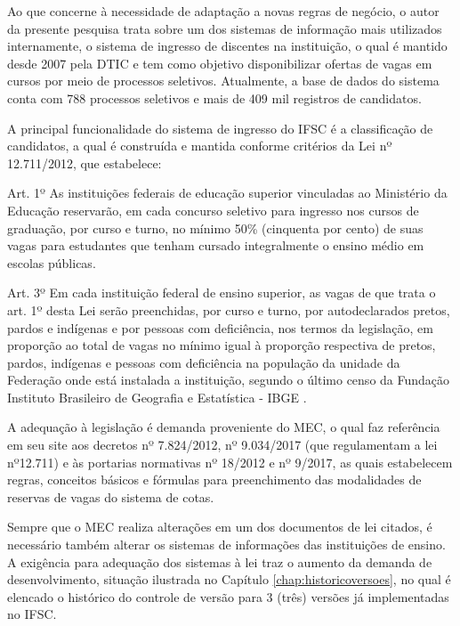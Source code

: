  Ao que concerne à necessidade de adaptação a novas regras de negócio, o autor da presente pesquisa trata sobre um dos sistemas de informação mais utilizados internamente, o sistema de ingresso de discentes na instituição, o qual é mantido desde 2007 pela \gls{DTIC} e tem como objetivo disponibilizar ofertas de vagas em cursos por meio de processos seletivos. Atualmente, a base de dados do sistema conta com 788 processos seletivos e mais de 409 mil registros de candidatos.
 
 A principal funcionalidade do sistema de ingresso do \gls{IFSC} é a classificação de candidatos, a qual é construída e mantida conforme critérios da Lei nº 12.711/2012, que estabelece:
 \begin{citacao}
 Art. 1º As instituições federais de educação superior vinculadas ao Ministério da Educação reservarão, em cada concurso seletivo para ingresso nos cursos de graduação, por curso e turno, no mínimo 50\% (cinquenta por cento) de suas vagas para estudantes que tenham cursado integralmente o ensino médio em escolas públicas.
 
 Art. 3º Em cada instituição federal de ensino superior, as vagas de que trata o art. 1º desta Lei serão preenchidas, por curso e turno, por autodeclarados pretos, pardos e indígenas e por pessoas com deficiência, nos termos da legislação, em proporção ao total de vagas no mínimo igual à proporção respectiva de pretos, pardos, indígenas e pessoas com deficiência na população da unidade da Federação onde está instalada a instituição, segundo o último censo da Fundação Instituto Brasileiro de Geografia e Estatística - IBGE \cite{leicotas}.  
 \end{citacao}
 
 A adequação à legislação é demanda proveniente do \gls{MEC}, o qual faz referência em seu site aos decretos nº 7.824/2012, nº 9.034/2017 (que regulamentam a lei nº12.711) e às portarias normativas nº 18/2012 e nº 9/2017, as quais estabelecem regras, conceitos básicos e fórmulas para preenchimento das modalidades de reservas de vagas do sistema de cotas. 
 
 Sempre que o \gls{MEC} realiza alterações em um dos documentos de lei citados, é necessário também alterar os sistemas de informações das instituições de ensino. A exigência para adequação dos sistemas à lei traz o aumento da demanda de desenvolvimento, situação ilustrada no Capítulo  \ref{chap:historicoversoes}, no qual é elencado o histórico do controle de versão para 3 (três) versões já implementadas no \gls{IFSC}.
 
 

 
 